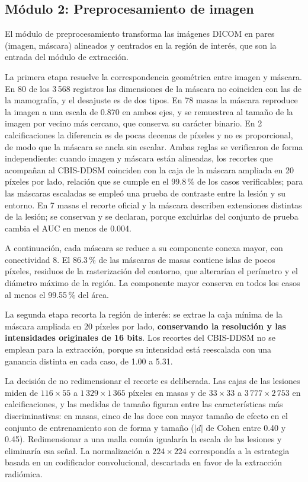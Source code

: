 
\subsection{Módulo 2: Preprocesamiento de imagen}

El módulo de preprocesamiento transforma las imágenes DICOM en pares (imagen, máscara) alineados y
centrados en la región de interés, que son la entrada del módulo de extracción.

La primera etapa resuelve la correspondencia geométrica entre imagen y máscara. En 80 de los
3\,568 registros las dimensiones de la máscara no coinciden con las de la mamografía, y el desajuste
es de dos tipos. En 78 masas la máscara reproduce la imagen a una escala de 0.870 en ambos ejes, y se
remuestrea al tamaño de la imagen por vecino más cercano, que conserva su carácter binario. En
2 calcificaciones la diferencia es de pocas decenas de píxeles y no es proporcional, de modo que la
máscara se ancla sin escalar. Ambas reglas se verificaron de forma independiente: cuando imagen y
máscara están alineadas, los recortes que acompañan al CBIS-DDSM coinciden con la caja de la máscara
ampliada en 20 píxeles por lado, relación que se cumple en el 99.8\,\% de los casos
verificables; para las máscaras escaladas se empleó una prueba de contraste entre la lesión y su
entorno. En 7 masas el recorte oficial y la máscara describen extensiones distintas de la lesión; se
conservan y se declaran, porque excluirlas del conjunto de prueba cambia el AUC en menos de 0.004.

A continuación, cada máscara se reduce a su componente conexa mayor, con conectividad 8. El
86.3\,\% de las máscaras de masas contiene islas de pocos píxeles, residuos de la
rasterización del contorno, que alterarían el perímetro y el diámetro máximo de la región. La
componente mayor conserva en todos los casos al menos el 99.55\,\% del área.

La segunda etapa recorta la región de interés: se extrae la caja mínima de la máscara ampliada en
20 píxeles por lado, \textbf{conservando la resolución y las intensidades originales de 16 bits}.
Los recortes del CBIS-DDSM no se emplean para la extracción, porque su intensidad está reescalada
con una ganancia distinta en cada caso, de 1.00 a 5.31.

La decisión de no redimensionar el recorte es deliberada. Las cajas de las lesiones miden de
\(116\times55\) a \(1\,329\times1\,365\) píxeles en masas y de \(33\times33\) a \(3\,777\times2\,753\)
en calcificaciones, y las medidas de tamaño figuran entre las características más discriminativas:
en masas, cinco de las doce con mayor tamaño de efecto en el conjunto de entrenamiento son de forma
y tamaño (\(|d|\) de Cohen entre 0.40 y 0.45). Redimensionar a una malla común igualaría la escala de
las lesiones y eliminaría esa señal. La normalización a \(224\times224\) correspondía a la estrategia
basada en un codificador convolucional, descartada en favor de la extracción radiómica.

